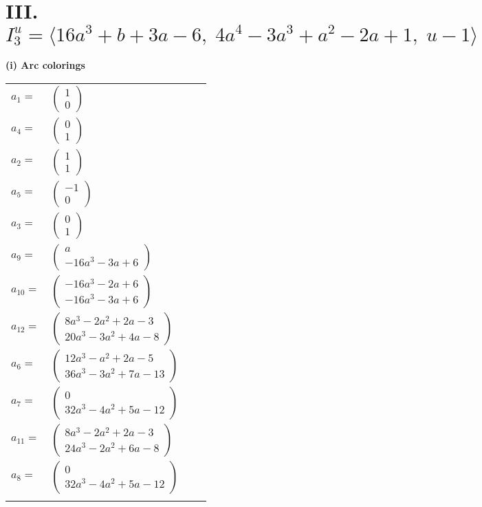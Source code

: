 \documentclass[1p]{elsarticle_modified}
\theoremstyle{definition}
\begin{document}
\centering \section*{III. $I^u_{3}= \langle 16 a^3+b+3 a-6,\;4 a^4-3 a^3+a^2-2 a+1,\;u-1 \rangle$}
\flushleft \textbf{(i) Arc colorings}\\
\begin{tabular}{m{7pt} m{180pt} m{7pt} m{180pt} }
\flushright $a_{1}=$&$\begin{pmatrix}1\\0\end{pmatrix}$ \\
\flushright $a_{4}=$&$\begin{pmatrix}0\\1\end{pmatrix}$ \\
\flushright $a_{2}=$&$\begin{pmatrix}1\\1\end{pmatrix}$ \\
\flushright $a_{5}=$&$\begin{pmatrix}-1\\0\end{pmatrix}$ \\
\flushright $a_{3}=$&$\begin{pmatrix}0\\1\end{pmatrix}$ \\
\flushright $a_{9}=$&$\begin{pmatrix}a\\-16 a^3-3 a+6\end{pmatrix}$ \\
\flushright $a_{10}=$&$\begin{pmatrix}-16 a^3-2 a+6\\-16 a^3-3 a+6\end{pmatrix}$ \\
\flushright $a_{12}=$&$\begin{pmatrix}8 a^3-2 a^2+2 a-3\\20 a^3-3 a^2+4 a-8\end{pmatrix}$ \\
\flushright $a_{6}=$&$\begin{pmatrix}12 a^3- a^2+2 a-5\\36 a^3-3 a^2+7 a-13\end{pmatrix}$ \\
\flushright $a_{7}=$&$\begin{pmatrix}0\\32 a^3-4 a^2+5 a-12\end{pmatrix}$ \\
\flushright $a_{11}=$&$\begin{pmatrix}8 a^3-2 a^2+2 a-3\\24 a^3-2 a^2+6 a-8\end{pmatrix}$ \\
\flushright $a_{8}=$&$\begin{pmatrix}0\\32 a^3-4 a^2+5 a-12\end{pmatrix}$\\&\end{tabular}
\end{document}
